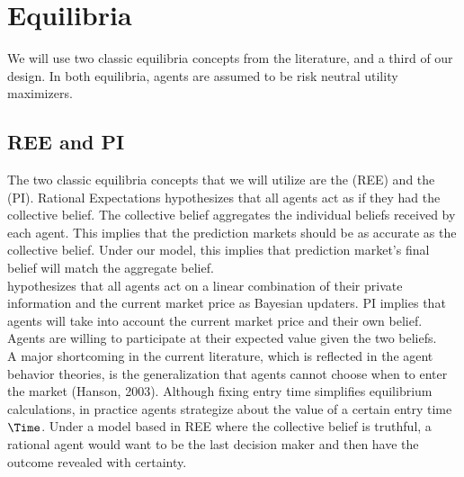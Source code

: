\section{Equilibria}
We will use two classic equilibria concepts from the literature, and a third of our design. In both equilibria, agents are assumed to be risk neutral utility maximizers.

\subsection{REE and PI}
The two classic equilibria concepts that we will utilize are the  (REE) and the  (PI). Rational Expectations hypothesizes that all agents act as if they had the collective belief. The collective belief aggregates the individual beliefs received by each agent. This implies that the prediction markets should be as accurate as the collective belief. Under our model, this implies that prediction market's final belief will match the aggregate belief.\\

 hypothesizes that all agents act on a linear combination of their private information and the current market price as Bayesian updaters. PI implies that agents will take into account the current market price and their own belief. Agents are willing to participate at their expected value given the two beliefs. \\

A major shortcoming in the current literature, which is reflected in the agent behavior theories, is the generalization that agents cannot choose when to enter the market (Hanson, 2003). Although fixing entry time simplifies equilibrium calculations, in practice agents strategize about the value of a certain entry time $\Time$. Under a model based in REE where the collective belief is truthful, a rational agent would want to be the last decision maker and then have the outcome revealed with certainty.\\

